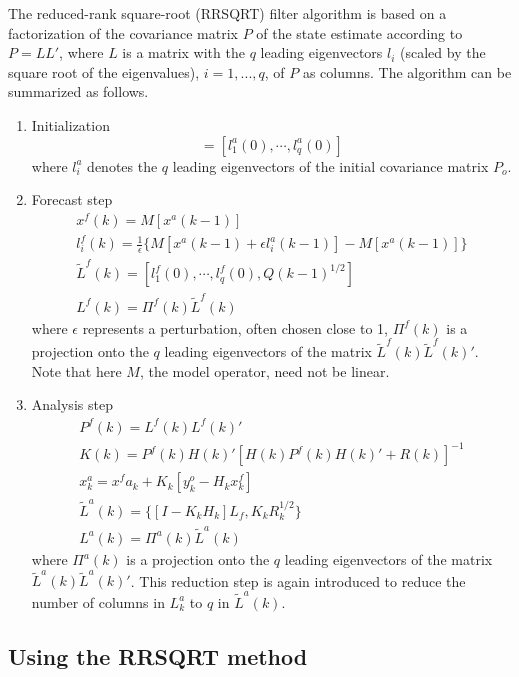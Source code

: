 The reduced-rank square-root (RRSQRT) filter algorithm is based on a
factorization of the covariance matrix $P$ of the state estimate according to
$P=LL'$, where $L$ is a matrix with the $q$ leading eigenvectors $l_i$ (scaled
by the square root of the eigenvalues), $i=1,...,q$, of $P$ as columns. The
algorithm can be summarized as follows.

\begin{enumerate}
\item Initialization
  \begin{equation}
    [L^a(0)]=[l_1^a(0),\cdots,l_q^a(0)]
  \end{equation}
  where $l_i^a$ denotes the $q$ leading eigenvectors of the initial covariance
  matrix $P_o$.

\item Forecast step
  \begin{eqnarray}
    x^f(k)=M[x^a(k-1)] \\
    l^f_i(k)=\frac{1}{\epsilon} \{ M[x^a(k-1)+ \epsilon  l^a_i(k-1)]-M[x^a(k-1)] \} \\
    \tilde{L}^f(k)=[l_1^f(0),\cdots,l_q^f(0),Q(k-1)^{1/2}] \\
    L^f(k)=\Pi^f(k)\tilde{L}^f(k)
  \end{eqnarray}
where $\epsilon$ represents a perturbation, often chosen close to 1, $\Pi^f(k)$
is a projection onto the $q$ leading eigenvectors of the matrix
$\tilde{L}^f(k)\tilde{L}^f(k)'$. Note that here $M$, the model operator, need
not be linear.

\item Analysis step
  \begin{eqnarray}
    P^f(k)=L^f(k)L^f(k)' \\
    K(k) = P^f(k)H(k)'[H(k)P^f(k)H(k)'+R(k)]^{-1} \\
    x^a_k = x^fa_k + K_k [y^o_k - H_k x^f_k] \\
    \tilde{L}^a(k)=\{[I - K_k H_k] L_f, K_k R_k^{1/2}\} \\
    L^a(k)=\Pi^a(k)\tilde{L}^a(k)
  \end{eqnarray}
where $\Pi^a(k)$ is a projection onto the $q$ leading eigenvectors of the
matrix $\tilde{L}^a(k)\tilde{L}^a(k)'$. This reduction step is again introduced
to reduce the number of columns in $L^a_k$ to $q$ in $\tilde{L}^a(k)$.
\end{enumerate}

\subsection{Using the RRSQRT method}


